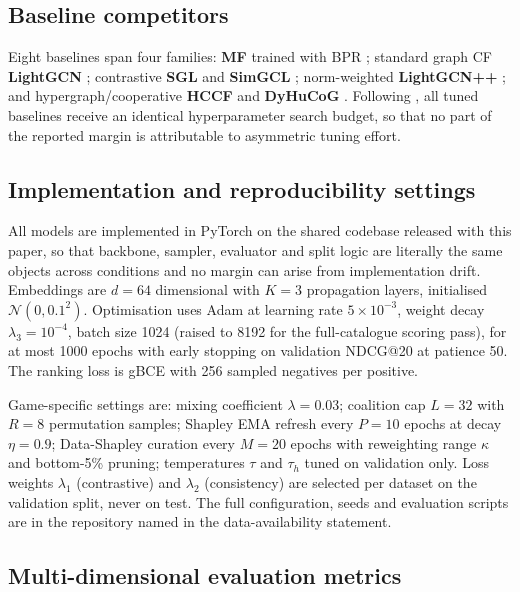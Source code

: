 \documentclass[final,5p,times,twocolumn]{elsarticle}
\begin{document}
\subsection{Baseline competitors}
\label{sec:baselines}

Eight baselines span four families: \textbf{MF} trained with BPR
\citep{rendle2009bpr}; standard graph CF \textbf{LightGCN}
\citep{he2020lightgcn}; contrastive \textbf{SGL} \citep{wu2021sgl} and
\textbf{SimGCL} \citep{yu2022simgcl}; norm-weighted \textbf{LightGCN++}
\citep{lee2024lightgcnpp}; and hypergraph/cooperative \textbf{HCCF}
\citep{xia2022hccf} and \textbf{DyHuCoG} \citep{louhichi2026dyhucog}.
Following \citep{dacrema2019worrying}, all tuned baselines receive an identical
hyperparameter search budget, so that no part of the reported margin is
attributable to asymmetric tuning effort.

\subsection{Implementation and reproducibility settings}
\label{sec:repro}

All models are implemented in PyTorch on the shared codebase released with
this paper, so that backbone, sampler, evaluator and split logic are literally
the same objects across conditions and no margin can arise from
implementation drift. Embeddings are $d = 64$ dimensional with $K = 3$
propagation layers, initialised $\mathcal{N}(0, 0.1^2)$. Optimisation uses
Adam at learning rate $5 \times 10^{-3}$, weight decay $\lambda_3 = 10^{-4}$,
batch size 1024 (raised to 8192 for the full-catalogue scoring pass), for at
most 1000 epochs with early stopping on validation NDCG@20 at patience 50.
The ranking loss is gBCE with 256 sampled negatives per positive.

Game-specific settings are: mixing coefficient $\lambda = 0.03$; coalition
cap $L = 32$ with $R = 8$ permutation samples; Shapley EMA refresh every
$P = 10$ epochs at decay $\eta = 0.9$; Data-Shapley curation every $M = 20$
epochs with reweighting range $\kappa$ and bottom-5\% pruning; temperatures
$\tau$ and $\tau_h$ tuned on validation only. Loss weights $\lambda_1$
(contrastive) and $\lambda_2$ (consistency) are selected per dataset on the
validation split, never on test. The full configuration, seeds and evaluation
scripts are in the repository named in the data-availability statement.

\subsection{Multi-dimensional evaluation metrics}
\label{sec:metrics}
\end{document}
